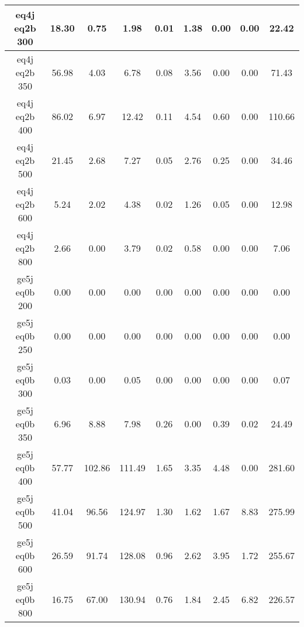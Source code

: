 \begin{longtable}{| c | c | c | c | c | c | c | c | c  | }
eq4j eq2b 300 & 18.30 & 0.75 & 1.98 & 0.01 & 1.38 & 0.00 & 0.00 & 22.42\\ \hline 
eq4j eq2b 350 & 56.98 & 4.03 & 6.78 & 0.08 & 3.56 & 0.00 & 0.00 & 71.43\\ \hline 
eq4j eq2b 400 & 86.02 & 6.97 & 12.42 & 0.11 & 4.54 & 0.60 & 0.00 & 110.66\\ \hline 
eq4j eq2b 500 & 21.45 & 2.68 & 7.27 & 0.05 & 2.76 & 0.25 & 0.00 & 34.46\\ \hline 
eq4j eq2b 600 & 5.24 & 2.02 & 4.38 & 0.02 & 1.26 & 0.05 & 0.00 & 12.98\\ \hline 
eq4j eq2b 800 & 2.66 & 0.00 & 3.79 & 0.02 & 0.58 & 0.00 & 0.00 & 7.06\\ \hline 
ge5j eq0b 200 & 0.00 & 0.00 & 0.00 & 0.00 & 0.00 & 0.00 & 0.00 & 0.00\\ \hline 
ge5j eq0b 250 & 0.00 & 0.00 & 0.00 & 0.00 & 0.00 & 0.00 & 0.00 & 0.00\\ \hline 
ge5j eq0b 300 & 0.03 & 0.00 & 0.05 & 0.00 & 0.00 & 0.00 & 0.00 & 0.07\\ \hline 
ge5j eq0b 350 & 6.96 & 8.88 & 7.98 & 0.26 & 0.00 & 0.39 & 0.02 & 24.49\\ \hline 
ge5j eq0b 400 & 57.77 & 102.86 & 111.49 & 1.65 & 3.35 & 4.48 & 0.00 & 281.60\\ \hline 
ge5j eq0b 500 & 41.04 & 96.56 & 124.97 & 1.30 & 1.62 & 1.67 & 8.83 & 275.99\\ \hline 
ge5j eq0b 600 & 26.59 & 91.74 & 128.08 & 0.96 & 2.62 & 3.95 & 1.72 & 255.67\\ \hline 
ge5j eq0b 800 & 16.75 & 67.00 & 130.94 & 0.76 & 1.84 & 2.45 & 6.82 & 226.57\\ \hline 
    \hline 
    \hline 
\end{longtable}
